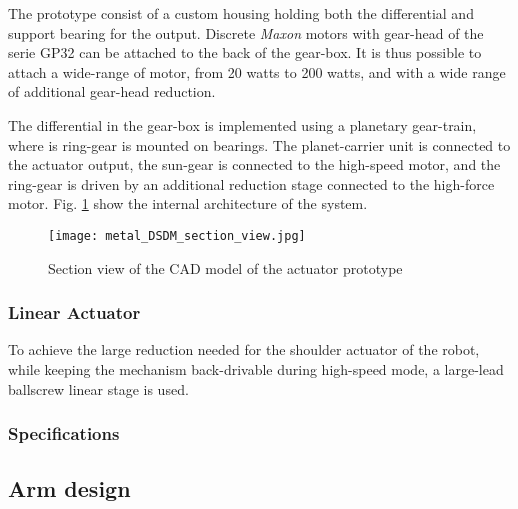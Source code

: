The prototype consist of a custom housing holding both the differential and support bearing for the output. Discrete \textit{Maxon} motors with gear-head of the serie GP32 can be attached to the back of the gear-box. It is thus possible to attach a wide-range of motor, from 20 watts to 200 watts, and with a wide range of additional gear-head reduction. 

The differential in the gear-box is implemented using a planetary gear-train, where is ring-gear is mounted on bearings. The planet-carrier unit is connected to the actuator output, the sun-gear is connected to the high-speed motor, and the ring-gear is driven by an additional reduction stage connected to the high-force motor. Fig. \ref{fig:dsdm_section} show the internal architecture of the system.


\begin{figure}[htp]
	\centering
		\texttt{[image: metal\_DSDM\_section\_view.jpg]}
	\caption{Section view of the CAD model of the actuator prototype} %
	\label{fig:dsdm_section}
\end{figure}


\subsubsection{Linear Actuator}

To achieve the large reduction needed for the shoulder actuator of the robot, while keeping the mechanism back-drivable during high-speed mode, a large-lead ballscrew linear stage is used. 


\subsubsection{Specifications}


\subsection{Arm design}
\label{sec:ArmDesign}




